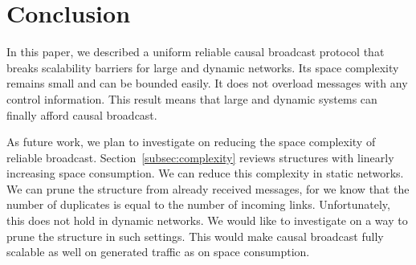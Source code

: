 
\section{Conclusion}
\label{sec:conclusion}



In this paper, we described a uniform reliable causal broadcast protocol that
breaks scalability barriers for large and dynamic networks. Its space complexity
remains small and can be bounded easily. It does not overload messages with any
control information. This result means that large and dynamic systems can
finally afford causal broadcast.




As future work, we plan to investigate on reducing the space complexity of
reliable broadcast. Section~\ref{subsec:complexity} reviews structures with
linearly increasing space consumption. We can reduce this complexity in static
networks. We can prune the structure from already received messages, for we know
that the number of duplicates is equal to the number of incoming
links. Unfortunately, this does not hold in dynamic networks. We would like to
investigate on a way to prune the structure in such settings. This would make
causal broadcast fully scalable as well on generated traffic as on space
consumption.








